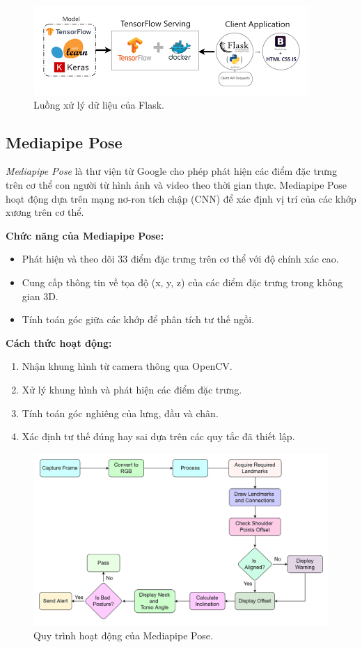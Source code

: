 \documentclass[conference]{IEEEtran}
\begin{document}
\begin{figure}[h]
    \centering
    \includegraphics[width=0.9\linewidth]{images/flask_workflow.png}
    \caption{Luồng xử lý dữ liệu của Flask.}
    \label{fig:flask_workflow}
\end{figure}

\subsection{Mediapipe Pose}
\textit{Mediapipe Pose} là thư viện từ Google cho phép phát hiện các điểm đặc trưng trên cơ thể con người từ hình ảnh và video theo thời gian thực. Mediapipe Pose hoạt động dựa trên mạng nơ-ron tích chập (CNN) để xác định vị trí của các khớp xương trên cơ thể.

\textbf{Chức năng của Mediapipe Pose:}
\begin{itemize}
    \item Phát hiện và theo dõi 33 điểm đặc trưng trên cơ thể với độ chính xác cao.
    \item Cung cấp thông tin về tọa độ (x, y, z) của các điểm đặc trưng trong không gian 3D.
    \item Tính toán góc giữa các khớp để phân tích tư thế ngồi.
\end{itemize}

\textbf{Cách thức hoạt động:}
\begin{enumerate}
    \item Nhận khung hình từ camera thông qua OpenCV.
    \item Xử lý khung hình và phát hiện các điểm đặc trưng.
    \item Tính toán góc nghiêng của lưng, đầu và chân.
    \item Xác định tư thế đúng hay sai dựa trên các quy tắc đã thiết lập.
\end{enumerate}

\begin{figure}[h]
    \centering
    \includegraphics[width=0.9\linewidth]{images/mediapipe_workflow.png}
    \caption{Quy trình hoạt động của Mediapipe Pose.}
    \label{fig:mediapipe_workflow}
\end{figure}
\end{document}
